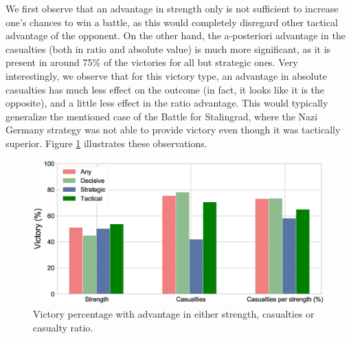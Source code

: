 We first observe that an advantage in strength only is not sufficient to increase one's chances to win a battle, as this would completely disregard other tactical advantage of the opponent. On the other hand, the a-posteriori advantage in the casualties (both in ratio and absolute value) is much more significant, as it is present in around 75\% of the victories for all but strategic ones. Very interestingly, we observe that for this victory type, an advantage in absolute casualties has much less effect on the outcome (in fact, it looks like it is the opposite), and a little less effect in the ratio advantage. This would typically generalize the mentioned case of the Battle for Stalingrad, where the Nazi Germany strategy was not able to provide victory even though it was tactically superior. Figure \ref{fig:victoryAdvantage} illustrates these observations.

 \begin{figure}[h]
	\centering	\includegraphics[width=\linewidth]{figures/VictoryAdvantage}
	\caption{Victory percentage with advantage in either strength, casualties or casualty ratio.}\label{fig:victoryAdvantage}
	\centering
\end{figure}


